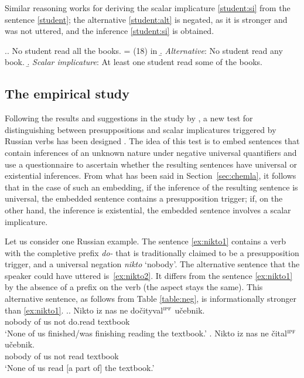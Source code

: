 Similar reasoning works for deriving the scalar implicature \ref{student:si} from the sentence \ref{student}; the alternative \ref{student:alt} is negated, as it is stronger and was not uttered, and the inference \ref{student:si} is obtained.

\ex.\a. \label{student}No student read all the books. \hfill = (18) in \citealt{Chemla:09}
\b. \label{student:alt} \textit{Alternative}: No student read any book.
\b. \label{student:si} \textit{Scalar implicature}: At least one student read some of the books.

\subsection{The empirical study}\label{empirical}
Following the results and suggestions in the study by \citet{Chemla:09}, a new test for distinguishing between presuppositions and scalar implicatures triggered by Russian verbs has been designed \citep{ZinovaFilip:SALT}. The idea of this test is to embed sentences that contain inferences of an unknown nature under negative universal quantifiers and use a questionnaire to ascertain whether the resulting sentences have universal or existential inferences. From what has been said in Section~\ref{sec:chemla}, it follows that in the case of such an embedding, if the inference of the resulting sentence is universal, the embedded sentence contains a presupposition trigger; if, on the other hand, the inference is existential, the embedded sentence involves a scalar implicature.

Let us consider one Russian example. The sentence \ref{ex:nikto1} contains a verb with the completive  prefix \textit{do-}   that is traditionally claimed to be a presupposition trigger, and a universal negation \textit{nikto} `nobody'. The alternative sentence that the speaker could have uttered is~\ref{ex:nikto2}. It differs from the sentence \ref{ex:nikto1} by the absence of a prefix on the verb (the aspect stays the same). This alternative sentence, as follows from Table \ref{table:neg}, is informationally stronger than \ref{ex:nikto1}.
\ex.\label{ex:nikto}\ag. \label{ex:nikto1}Nikto iz nas ne do\v{c}ityval$^{\textsc{ipf}}$ u\v{c}ebnik.\\
nobody of us not do.read textbook\\
 `None of us finished/was finishing reading the textbook.'
\bg. \label{ex:nikto2}Nikto iz nas ne \v{c}ital$^{\textsc{ipf}}$ u\v{c}ebnik.\\
nobody of us not read textbook\\
 `None of us read $[$a part of$]$ the textbook.'

